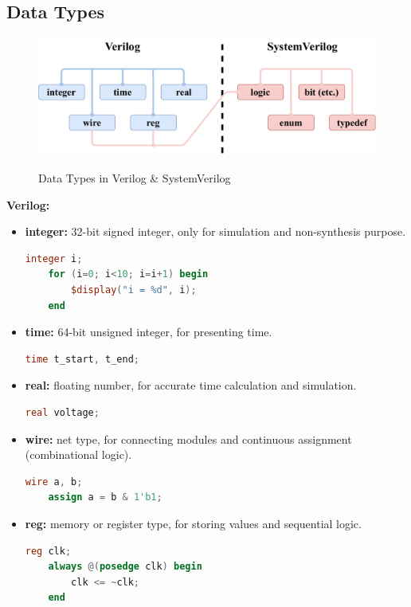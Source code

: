 \documentclass{article}
\begin{document}
\subsection{Data Types}
\begin{figure}[h]
    \centering
    \includegraphics[width=\textwidth]{figures/DataType.pdf}
    \label{fig:DataType}
    \caption{Data Types in Verilog \& SystemVerilog}
\end{figure}
\textbf{Verilog:}
\begin{itemize}
    \item \textbf{integer:} 32-bit signed integer, only for simulation and non-synthesis purpose.
    \begin{lstlisting}[language=Verilog,frame=single,backgroundcolor=\color{White},basicstyle=\color{LightGreen},showspaces=false,showstringspaces=false]
    integer i;
    for (i=0; i<10; i=i+1) begin
        $display("i = %d", i);
    end
    \end{lstlisting}
    \item \textbf{time:} 64-bit unsigned integer, for presenting time.
    \begin{lstlisting}[language=Verilog,frame=single,backgroundcolor=\color{White},basicstyle=\color{LightGreen},showspaces=false,showstringspaces=false]
    time t_start, t_end;
    \end{lstlisting}
    \item \textbf{real:} floating number, for accurate time calculation and simulation.
    \begin{lstlisting}[language=Verilog,frame=single,backgroundcolor=\color{White},basicstyle=\color{LightGreen},showspaces=false,showstringspaces=false]
    real voltage;
    \end{lstlisting}
    \item \textbf{wire:} net type, for connecting modules and continuous assignment (combinational logic).
    \begin{lstlisting}[language=Verilog,frame=single,backgroundcolor=\color{White},basicstyle=\color{LightGreen},showspaces=false,showstringspaces=false]
    wire a, b;
    assign a = b & 1'b1;
    \end{lstlisting}
    \item \textbf{reg:} memory or register type, for storing values and sequential logic.
    \begin{lstlisting}[language=Verilog,frame=single,backgroundcolor=\color{White},basicstyle=\color{LightGreen},showspaces=false,showstringspaces=false]
    reg clk;
    always @(posedge clk) begin
        clk <= ~clk;
    end
    \end{lstlisting}
\end{itemize}
\end{document}
